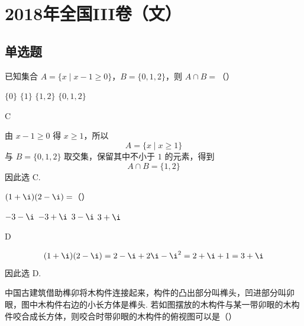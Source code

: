 \chapter{2018年全国III卷（文）}

\section{单选题}

\begin{problem}
已知集合 \(A=\{x\mid x-1\ge0\}\)，\(B=\{0,1,2\}\)，则 \(A\cap B=\)（\quad）

\choices
    {\(\{0\}\)}
    {\(\{1\}\)}
    {\(\{1,2\}\)}
    {\(\{0,1,2\}\)}
\end{problem}

\begin{answer}
C
\end{answer}

\begin{solution}
由 \(x-1\ge0\) 得 \(x\ge1\)，所以
\[
A=\{x\mid x\ge1\}
\]
与 \(B=\{0,1,2\}\) 取交集，保留其中不小于 \(1\) 的元素，得到
\[
A\cap B=\{1,2\}
\]
因此选 C.
\end{solution}

\begin{problem}
\((1+\i)(2-\i)=\)（\quad）

\choices
    {\(-3-\i\)}
    {\(-3+\i\)}
    {\(3-\i\)}
    {\(3+\i\)}
\end{problem}

\begin{answer}
D
\end{answer}

\begin{solution}
\[
(1+\i)(2-\i)=2-\i+2\i-\i^2=2+\i+1=3+\i
\]
因此选 D.
\end{solution}

\begin{problem}
中国古建筑借助榫卯将木构件连接起来，构件的凸出部分叫榫头，凹进部分叫卯眼，图中木构件右边的小长方体是榫头. 若如图摆放的木构件与某一带卯眼的木构件咬合成长方体，则咬合时带卯眼的木构件的俯视图可以是（\quad）


    {}
    {}
    {}
\end{problem}

